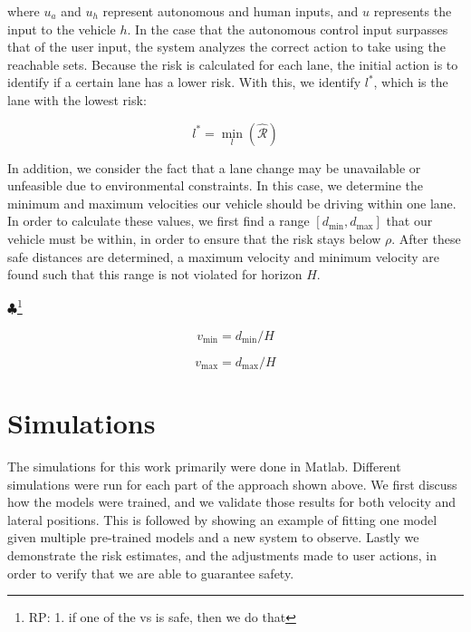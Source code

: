 \documentclass[letterpaper, 10 pt, conference]{ieeeconf}  %
\newcommand\RP[1]{$\clubsuit$\footnote{RP: #1}}
\begin{document}
where $u_a$ and $u_h$ represent autonomous and human inputs, and $u$ represents the input to the vehicle $h$. In the case that the autonomous control input surpasses that of the user input, the system analyzes the correct action to take using the reachable sets. Because the risk is calculated for each lane, the initial action is to identify if a certain lane has a lower risk. With this, we identify $l^*$, which is the lane with the lowest risk:

\begin{equation}
    l^* = \min_l(\mathcal{\hat{R}})
\end{equation}

In addition, we consider the fact that a lane change may be unavailable or unfeasible due to environmental constraints. In this case, we determine the minimum and maximum velocities our vehicle should be driving within one lane. In order to calculate these values, we first find a range $[d_{\min},d_{\max}]$ that our vehicle must be within, in order to ensure that the risk stays below $\rho$. After these safe distances are determined, a maximum velocity and minimum velocity are found such that this range is not violated for horizon $H$.

\RP{1. if one of the vs is safe, then we do that}

\begin{equation}
    v_{\min} = d_{\min}/H
\end{equation}

\begin{equation}
    v_{\max} = d_{\max}/H
\end{equation}



\section{Simulations} \label{sec:sims}
The simulations for this work primarily were done in Matlab. Different simulations were run for each part of the approach shown above. We first discuss how the models were trained, and we validate those results for both velocity and lateral positions. This is followed by showing an example of fitting one model given multiple pre-trained models and a new system to observe. Lastly we demonstrate the risk estimates, and the adjustments made to user actions, in order to verify that we are able to guarantee safety.
\end{document}
